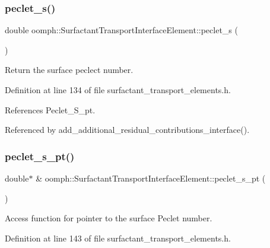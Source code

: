 \subsubsection{\texorpdfstring{peclet\+\_\+s()}{peclet\_s()}}
{\footnotesize\ttfamily double oomph\+::\+Surfactant\+Transport\+Interface\+Element\+::peclet\+\_\+s (\begin{DoxyParamCaption}{ }\end{DoxyParamCaption})\hspace{0.3cm}{\ttfamily [inline]}}



Return the surface peclect number. 



Definition at line 134 of file surfactant\+\_\+transport\+\_\+elements.\+h.



References Peclet\+\_\+\+S\+\_\+pt.



Referenced by add\+\_\+additional\+\_\+residual\+\_\+contributions\+\_\+interface().

\mbox{\label{classoomph_1_1SurfactantTransportInterfaceElement_a3ce30a3705a18034585c80d2f9757099}} 
\subsubsection{\texorpdfstring{peclet\+\_\+s\+\_\+pt()}{peclet\_s\_pt()}}
{\footnotesize\ttfamily double$\ast$ \& oomph\+::\+Surfactant\+Transport\+Interface\+Element\+::peclet\+\_\+s\+\_\+pt (\begin{DoxyParamCaption}{ }\end{DoxyParamCaption})\hspace{0.3cm}{\ttfamily [inline]}}



Access function for pointer to the surface Peclet number. 



Definition at line 143 of file surfactant\+\_\+transport\+\_\+elements.\+h.



